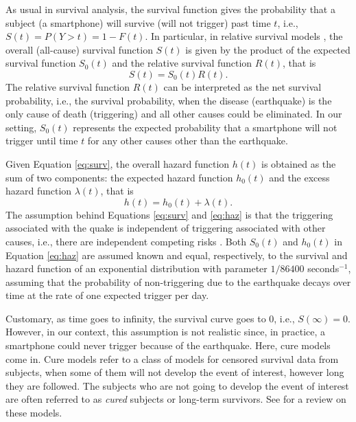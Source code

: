 \documentclass[final]{statsoc}
\begin{document}
As usual in survival analysis, the survival function gives the probability that a subject (a smartphone) will survive (will not trigger) past time $t$, i.e., $S(t) = P(Y > t) = 1 - F(t)$. In particular, in relative survival models \citep{deangelis1999,lambert2010estimating}, the overall (all-cause) survival function $S(t)$ is given by the product of the expected survival function $S_{0}(t)$ and the relative survival function $R(t)$, that is
%
\begin{equation}\label{eq:surv}
    S(t) = S_{0}(t)R(t).
\end{equation}
%
 The relative survival function $R(t)$ can be interpreted as the net survival probability, i.e., the survival probability, when the disease (earthquake) is the only cause of death (triggering) and all other causes could be eliminated. In our setting, $S_{0}(t)$ represents the expected probability that a smartphone will not trigger until time $t$ for any other causes other than the earthquake. 

Given Equation \eqref{eq:surv}, the overall hazard function $h(t)$ is obtained as the sum of two components: the expected hazard function $h_{0}(t)$ and the excess hazard function $\lambda(t)$, that is
%
\begin{equation}\label{eq:haz}
    h(t) = h_{0}(t) + \lambda(t).
\end{equation}
%
The assumption behind Equations \eqref{eq:surv} and \eqref{eq:haz} is that the triggering associated with the quake is independent of triggering associated with other causes, i.e., there are independent competing risks \citep{gamel2001non}.
Both $S_0(t)$ and $h_0(t)$ in Equation \eqref{eq:haz} are assumed known and equal, respectively, to  the survival and hazard function of an exponential distribution with  parameter $1/86400$ seconds$^{-1}$, assuming that  the probability of non-triggering due to the earthquake decays over time at the  rate of one expected trigger per day.

Customary, as time goes to infinity, the survival curve goes to 0, i.e., $S(\infty)=0$. However, in our context, this assumption is not realistic since, in practice, a smartphone could never trigger because of the earthquake. Here, cure models come in. Cure models refer to a class of models for censored survival data from subjects, when some of them will not develop the event of interest, however long they are followed. The subjects who are not going to develop the event of interest are often referred to as \emph{cured} subjects or long-term survivors. See \citet{peng2014cure} for a review on these models.
\end{document}
